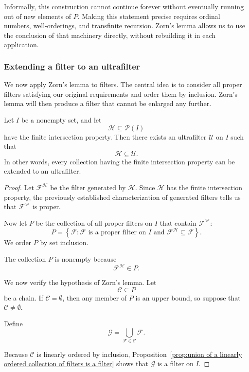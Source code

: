 {Informally, this construction cannot continue forever without eventually
running out of new elements of \(P\). Making this statement precise
requires ordinal numbers, well-orderings, and transfinite recursion.
Zorn's lemma allows us to use the conclusion of that machinery directly,
without rebuilding it in each application.

\subsubsection{Extending a filter to an ultrafilter}

We now apply Zorn's lemma to filters. The central idea is to consider all
proper filters satisfying our original requirements and order them by
inclusion. Zorn's lemma will then produce a filter that cannot be enlarged
any further.

\begin{thm}
\label{thm:ultrafilter-extension}
Let \(I\) be a nonempty set, and let
\[
\mathcal{H}\subseteq\mathcal{P}(I)
\]
have the finite intersection property. Then there exists an ultrafilter
\(\mathcal{U}\) on \(I\) such that
\[
\mathcal{H}\subseteq\mathcal{U}.
\]
In other words, every collection having the finite intersection property
can be extended to an ultrafilter.
\end{thm}

\begin{proof}
Let $\mathcal{F}^{\mathcal{H}}$ be the filter generated by \(\mathcal{H}\). Since \(\mathcal{H}\) has the finite intersection property, the previously established characterization of generated filters tells us that
$\mathcal{F}^{\mathcal{H}}$
is proper.

Now let \(P\) be the collection of all proper filters on \(I\) that contain
\(\mathcal{F}^{\mathcal{H}}\):
\[
P
=
\left\{
\mathcal{F}:
\mathcal{F}\text{ is a proper filter on }I
\text{ and }
\mathcal{F}^{\mathcal{H}}\subseteq\mathcal{F}
\right\}.
\]
We order \(P\) by set inclusion.

The collection \(P\) is nonempty because
\[
\mathcal{F}^{\mathcal{H}}\in P.
\]

We now verify the hypothesis of Zorn's lemma. Let
\[
\mathcal{C}\subseteq P
\]
be a chain. If \(\mathcal{C}=\emptyset\), then any member of \(P\) is an
upper bound, so suppose that \(\mathcal{C}\neq\emptyset\).

Define
\[
\mathcal{G}
=
\bigcup_{\mathcal{F}\in\mathcal{C}}\mathcal{F}.
\]

Because \(\mathcal{C}\) is linearly ordered by inclusion,
Proposition~\ref{prop:union of a linearly ordered collection of filters is a filter}
shows that \(\mathcal{G}\) is a filter on \(I\).


\end{proof}}
